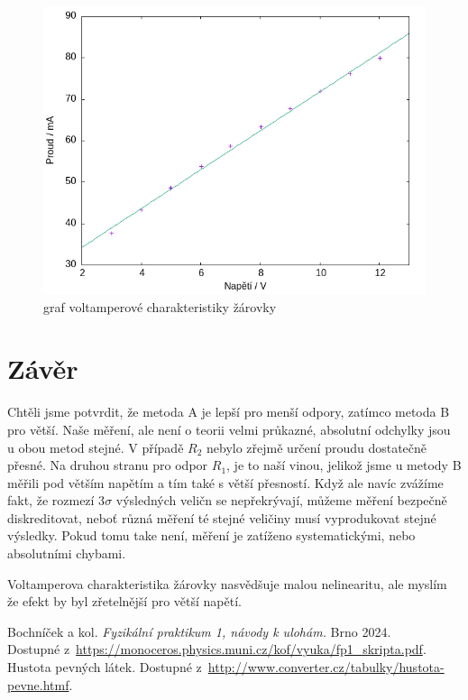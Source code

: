 \documentclass[a4paper,11pt]{article}
\begin{document}
\begin{figure}[htpb]
  \centering
  \includegraphics[width=0.7\linewidth]{zarovka-graf.png}
  \caption{graf voltamperové charakteristiky žárovky}
\end{figure}


\section{Závěr} 

Chtěli jsme potvrdit, že metoda A je lepší pro menší odpory, zatímco metoda B pro větší. 
Naše měření, ale není o teorii velmi průkazné, absolutní odchylky jsou u obou metod stejné. 
V případě $R_2$ nebylo zřejmě určení proudu dostatečně přesné. 
Na druhou stranu pro odpor $R_1$, je to naší vinou, jelikož jsme u metody B měřili pod větším napětím a tím také s větší přesností. 
Když ale navíc zvážíme fakt, že rozmezí 3$\sigma$ výsledných veličn se nepřekrývají, 
můžeme měření bezpečně diskreditovat, neboť různá měření té stejné veličiny musí vyprodukovat stejné výsledky. 
Pokud tomu take není, měření je zatíženo systematickými, nebo absolutními chybami. \par
Voltamperova charakteristika žárovky nasvědšuje malou nelinearitu, ale myslím že efekt by 
byl zřetelnější pro větší napětí.



\begin{thebibliography}{0}
 Bochníček a kol. \textit{Fyzikální praktikum 1, návody k ulohám.} Brno 2024.\\ Dostupné z~\url{https://monoceros.physics.muni.cz/kof/vyuka/fp1_skripta.pdf}.   
 Hustota pevných látek. Dostupné z~\url{http://www.converter.cz/tabulky/hustota-pevne.htmf}.   
\end{thebibliography}
\end{document}
